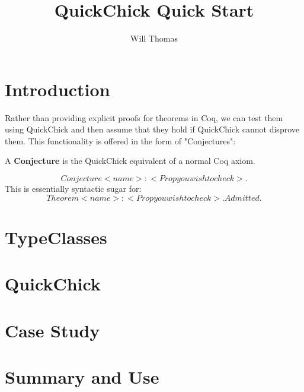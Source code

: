 \documentclass{article}
\title{\textbf{QuickChick Quick Start}}
\author{Will Thomas}
\begin{document}
    \maketitle

    \section{Introduction}
    Rather than providing explicit proofs for theorems in Coq, we can test them using QuickChick and then assume that they hold if QuickChick cannot disprove them. This functionality is offered in the form of "Conjectures": 
    \begin{definition}
        A \textbf{Conjecture} is the QuickChick equivalent of a normal Coq axiom.
    \end{definition}
    $$ Conjecture <name> : <Prop you wish to check>.$$ 
    This is essentially syntactic sugar for:
    $$ Theorem <name> : <Prop you wish to check>. Admitted.$$


    \section{TypeClasses}

    \section{QuickChick}

    \section{Case Study}

    \section{Summary and Use}
\end{document}
